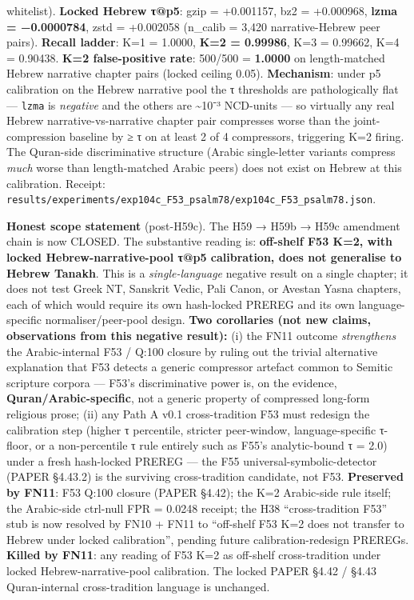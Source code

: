 \documentclass[
]{article}
\begin{document}
\begin{itemize}
  whitelist). \textbf{Locked Hebrew τ@p5}: gzip = +0.001157, bz2 =
  +0.000968, \textbf{lzma = −0.0000784}, zstd = +0.002058 (n\_calib =
  3,420 narrative-Hebrew peer pairs). \textbf{Recall ladder}: K=1 =
  1.0000, \textbf{K=2 = 0.99986}, K=3 = 0.99662, K=4 = 0.90438.
  \textbf{K=2 false-positive rate}: 500/500 = \textbf{1.0000} on
  length-matched Hebrew narrative chapter pairs (locked ceiling 0.05).
  \textbf{Mechanism}: under p5 calibration on the Hebrew narrative pool
  the τ thresholds are pathologically flat --- \texttt{lzma} is
  \emph{negative} and the others are \textasciitilde10⁻³ NCD-units ---
  so virtually any real Hebrew narrative-vs-narrative chapter pair
  compresses worse than the joint-compression baseline by ≥ τ on at
  least 2 of 4 compressors, triggering K=2 firing. The Quran-side
  discriminative structure (Arabic single-letter variants compress
  \emph{much} worse than length-matched Arabic peers) does not exist on
  Hebrew at this calibration. Receipt:
  \texttt{results/experiments/exp104c\_F53\_psalm78/exp104c\_F53\_psalm78.json}.
\end{itemize}

\textbf{Honest scope statement} (post-H59c). The H59 → H59b → H59c
amendment chain is now CLOSED. The substantive reading is:
\textbf{off-shelf F53 K=2, with locked Hebrew-narrative-pool τ@p5
calibration, does not generalise to Hebrew Tanakh}. This is a
\emph{single-language} negative result on a single chapter; it does not
test Greek NT, Sanskrit Vedic, Pali Canon, or Avestan Yasna chapters,
each of which would require its own hash-locked PREREG and its own
language-specific normaliser/peer-pool design. \textbf{Two corollaries
(not new claims, observations from this negative result):} (i) the FN11
outcome \emph{strengthens} the Arabic-internal F53 / Q:100 closure by
ruling out the trivial alternative explanation that F53 detects a
generic compressor artefact common to Semitic scripture corpora ---
F53's discriminative power is, on the evidence,
\textbf{Quran/Arabic-specific}, not a generic property of compressed
long-form religious prose; (ii) any Path A v0.1 cross-tradition F53 must
redesign the calibration step (higher τ percentile, stricter
peer-window, language-specific τ-floor, or a non-percentile τ rule
entirely such as F55's analytic-bound τ = 2.0) under a fresh hash-locked
PREREG --- the F55 universal-symbolic-detector (PAPER §4.43.2) is the
surviving cross-tradition candidate, not F53. \textbf{Preserved by
FN11}: F53 Q:100 closure (PAPER §4.42); the K=2 Arabic-side rule itself;
the Arabic-side ctrl-null FPR = 0.0248 receipt; the H38
``cross-tradition F53'' stub is now resolved by FN10 + FN11 to
``off-shelf F53 K=2 does not transfer to Hebrew under locked
calibration'', pending future calibration-redesign PREREGs.
\textbf{Killed by FN11}: any reading of F53 K=2 as off-shelf
cross-tradition under locked Hebrew-narrative-pool calibration. The
locked PAPER §4.42 / §4.43 Quran-internal cross-tradition language is
unchanged.
\end{document}
